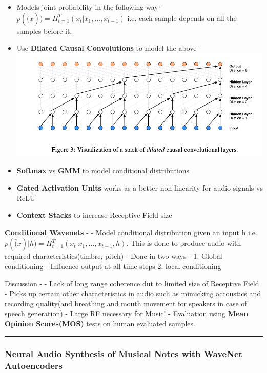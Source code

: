 \documentclass[11pt]{article}
\makeatletter
\def\maxwidth{\ifdim\Gin@nat@width>\linewidth\linewidth
    \else\Gin@nat@width\fi}
\let\Oldincludegraphics\includegraphics
\renewcommand{\includegraphics}[1]{\Oldincludegraphics[width=.8\maxwidth]{#1}}
\providecommand{\tightlist}{%
      \setlength{\itemsep}{0pt}\setlength{\parskip}{0pt}}
\makeatother
\begin{document}
    \begin{itemize}
\tightlist
\item
  Models joint probability in the following way -
  \(p(\bar(x)) = \Pi_{t=1}^{T}(x_{t}|x_{1},\dots,x_{t-1})\) i.e. each
  sample depends on all the samples before it.
\item
  Use \textbf{Dilated Causal Convolutions} to model the above -
  \includegraphics{fig_04.PNG}
\item
  \textbf{Softmax} vs \textbf{GMM} to model conditional distributions
\item
  \textbf{Gated Activation Units} works as a better non-linearity for
  audio signals vs ReLU
\item
  \textbf{Context Stacks} to increase Receptive Field size
\end{itemize}

    \textbf{Conditional Wavenets} - - Model conditional distribution given
an input h i.e.
\(p(\bar(x)|h) = \Pi_{t=1}^{T}(x_{t}|x_{1},\dots,x_{t-1},h)\). This is
done to produce audio with required characteristics(timbre, pitch) -
Done in two ways - 1. Global conditioning - Influence output at all time
steps 2. local conditioning

    Discussion - - Lack of long range coherence dut to limited size of
Receptive Field - Picks up certain other characteristics in audio such
as mimicking accoustics and recording quality(and breathing and mouth
movement for speakers in case of speech generation) - Large RF necessary
for Music! - Evaluation using \textbf{Mean Opinion Scores(MOS)} tests on
human evaluated samples.

    \begin{center}\rule{0.5\linewidth}{\linethickness}\end{center}

\subsubsection{Neural Audio Synthesis of Musical Notes with WaveNet
Autoencoders}\label{neural-audio-synthesis-of-musical-notes-with-wavenet-autoencoders}
\end{document}
